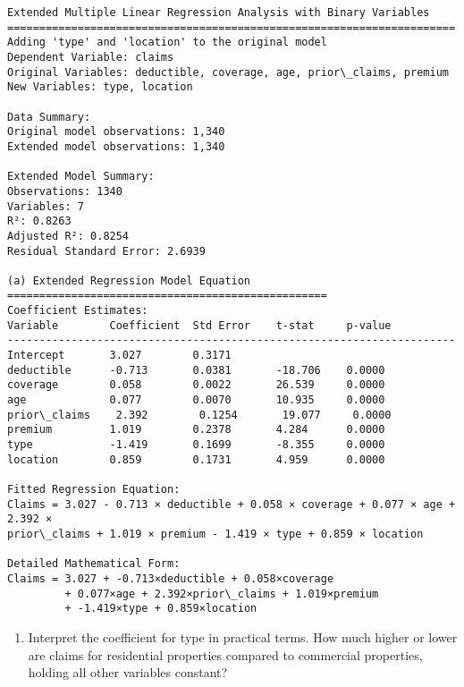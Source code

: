 \documentclass[8pt, twocolumn]{extarticle}
\providecommand{\tightlist}{%
      \setlength{\itemsep}{0pt}\setlength{\parskip}{0pt}}
\begin{document}
    \begin{Verbatim}[commandchars=\\\{\}]
Extended Multiple Linear Regression Analysis with Binary Variables
======================================================================
Adding 'type' and 'location' to the original model
Dependent Variable: claims
Original Variables: deductible, coverage, age, prior\_claims, premium
New Variables: type, location

Data Summary:
Original model observations: 1,340
Extended model observations: 1,340

Extended Model Summary:
Observations: 1340
Variables: 7
R²: 0.8263
Adjusted R²: 0.8254
Residual Standard Error: 2.6939

(a) Extended Regression Model Equation
==================================================
Coefficient Estimates:
Variable        Coefficient  Std Error    t-stat     p-value
----------------------------------------------------------------------
Intercept       3.027        0.3171
deductible      -0.713       0.0381       -18.706    0.0000
coverage        0.058        0.0022       26.539     0.0000
age             0.077        0.0070       10.935     0.0000
prior\_claims    2.392        0.1254       19.077     0.0000
premium         1.019        0.2378       4.284      0.0000
type            -1.419       0.1699       -8.355     0.0000
location        0.859        0.1731       4.959      0.0000

Fitted Regression Equation:
Claims = 3.027 - 0.713 × deductible + 0.058 × coverage + 0.077 × age + 2.392 ×
prior\_claims + 1.019 × premium - 1.419 × type + 0.859 × location

Detailed Mathematical Form:
Claims = 3.027 + -0.713×deductible + 0.058×coverage
         + 0.077×age + 2.392×prior\_claims + 1.019×premium
         + -1.419×type + 0.859×location
    \end{Verbatim}

    \begin{enumerate}
\def\labelenumi{(\alph{enumi})}
\setcounter{enumi}{1}
\tightlist
\item
  Interpret the coefficient for type in practical terms. How much higher
  or lower are claims for residential properties compared to commercial
  properties, holding all other variables constant?
\end{enumerate}
\end{document}
